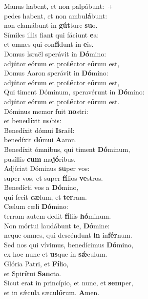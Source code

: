 \oddverse Manus habent, et non palpábunt:~+\\
\oddverse  pedes habent, et non ambu\textbf{lá}bunt:~\*\\
\oddverse non clamábunt in \textbf{gút}ture \textbf{su}o.\\
\evenverse Símiles illis fiant qui fáciunt \textbf{e}a:~\*\\
\evenverse et omnes qui con\textbf{fí}dunt in \textbf{e}is.\\
\oddverse Domus Israël sperávit in \textbf{Dó}mino:~\*\\
\oddverse adjútor eórum et pro\textbf{té}ctor e\textbf{ó}rum est,\\
\evenverse Domus Aaron sperávit in \textbf{Dó}mino:~\*\\
\evenverse adjútor eórum et pro\textbf{té}ctor e\textbf{ó}rum est,\\
\oddverse Qui timent Dóminum, speravérunt in \textbf{Dó}mino:~\*\\
\oddverse adjútor eórum et pro\textbf{té}ctor e\textbf{ó}rum est.\\
\evenverse Dóminus memor fuit \textbf{no}stri:~\*\\
\evenverse et bene\textbf{dí}xit \textbf{no}bis:\\
\oddverse Benedíxit dómui \textbf{Is}raël:~\*\\
\oddverse benedíxit \textbf{dó}mui \textbf{A}aron.\\
\evenverse Benedíxit ómnibus, qui timent \textbf{Dó}minum,~\*\\
\evenverse pusíllis \textbf{cum} ma\textbf{jó}ribus.\\
\oddverse Adjíciat Dóminus \textbf{su}per vos:~\*\\
\oddverse super vos, et super \textbf{fí}lios \textbf{ve}stros.\\
\evenverse Benedícti vos a \textbf{Dó}mino,~\*\\
\evenverse qui fecit \textbf{cæ}lum, et \textbf{ter}ram.\\
\oddverse Cælum cæli \textbf{Dó}mino:~\*\\
\oddverse terram autem dedit \textbf{fí}liis \textbf{hó}minum.\\
\evenverse Non mórtui laudábunt te, \textbf{Dó}mine:~\*\\
\evenverse neque omnes, qui descéndunt \textbf{in} in\textbf{fér}num.\\
\oddverse Sed nos qui vívimus, benedícimus \textbf{Dó}mino,~\*\\
\oddverse ex hoc nunc et \textbf{us}que in \textbf{sǽ}culum.\\
\evenverse Glória Patri, et \textbf{Fí}lio,~\*\\
\evenverse et Spi\textbf{rí}tui \textbf{San}cto.\\
\oddverse Sicut erat in princípio, et nunc, et \textbf{sem}per,~\*\\
\oddverse et in sǽcula sæcu\textbf{ló}rum. \textbf{A}men.\\
